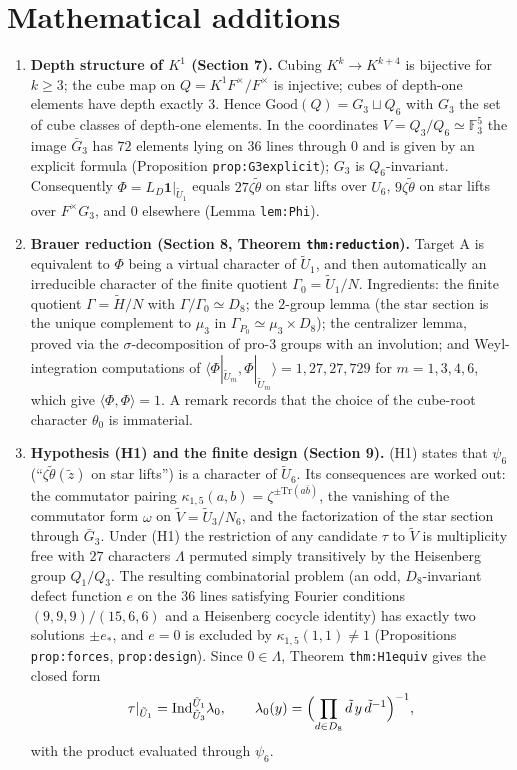 \documentclass[11pt]{article}
\newcommand{\F}{\mathbb F}
\begin{document}
\section*{Mathematical additions}
\begin{enumerate}[leftmargin=*]
\item \textbf{Depth structure of $K^1$ (Section 7).}  Cubing
$K^k\to K^{k+4}$ is bijective for $k\ge3$; the cube map on
$Q=K^1F^\times/F^\times$ is injective; cubes of depth-one elements have depth
exactly $3$.  Hence $\mathrm{Good}(Q)=G_3\sqcup Q_6$ with $G_3$ the set of
cube classes of depth-one elements.  In the coordinates
$V=Q_3/Q_6\simeq\F_3^5$ the image $\bar G_3$ has $72$ elements lying on
$36$ lines through $0$ and is given by an explicit formula (Proposition
\texttt{prop:G3explicit}); $G_3$ is $Q_6$-invariant.  Consequently
$\Phi=L_D\mathbf 1|_{\tilde U_1}$ equals $27\zeta\tilde\theta$ on star
lifts over $U_6$, $9\zeta\tilde\theta$ on star lifts over $F^\times G_3$, and
$0$ elsewhere (Lemma \texttt{lem:Phi}).

\item \textbf{Brauer reduction (Section 8, Theorem \texttt{thm:reduction}).}
Target A is equivalent to $\Phi$ being a virtual character of $\tilde U_1$,
and then automatically an irreducible character of the finite quotient
$\Gamma_0=\tilde U_1/N$.  Ingredients: the finite quotient
$\Gamma=\tilde H/N$ with $\Gamma/\Gamma_0\simeq D_8$; the $2$-group lemma
(the star section is the unique complement to $\mu_3$ in
$\Gamma_{P_0}\simeq\mu_3\times D_8$); the centralizer lemma, proved via the
$\sigma$-decomposition of pro-$3$ groups with an involution; and
Weyl-integration computations of
$\langle\Phi|_{\tilde U_m},\Phi|_{\tilde U_m}\rangle=1,27,27,729$ for
$m=1,3,4,6$, which give $\langle\Phi,\Phi\rangle=1$.  A remark records that
the choice of the cube-root character $\theta_0$ is immaterial.

\item \textbf{Hypothesis (H1) and the finite design (Section 9).}
(H1) states that $\psi_6$ (``$\zeta\tilde\theta(\tilde z)$ on star lifts'')
is a character of $\tilde U_6$.  Its consequences are worked out: the
commutator pairing $\kappa_{1,5}(a,b)=\zeta^{\pm\mathrm{Tr}(a\bar b)}$, the
vanishing of the commutator form $\omega$ on $\tilde V=\tilde U_3/N_6$, and
the factorization of the star section through $\bar G_3$.  Under (H1) the
restriction of any candidate $\tau$ to $\tilde V$ is multiplicity free with
$27$ characters $\Lambda$ permuted simply transitively by the Heisenberg
group $Q_1/Q_3$.  The resulting combinatorial problem (an odd,
$D_8$-invariant defect function $e$ on the $36$ lines satisfying Fourier
conditions $(9,9,9)/(15,6,6)$ and a Heisenberg cocycle identity) has exactly
two solutions $\pm e_*$, and $e=0$ is excluded by $\kappa_{1,5}(1,1)\neq1$
(Propositions \texttt{prop:forces}, \texttt{prop:design}).  Since
$0\in\Lambda$, Theorem \texttt{thm:H1equiv} gives the closed form
\[
 \tau|_{\tilde U_1}=\mathrm{Ind}_{\tilde U_3}^{\tilde U_1}\lambda_0,\qquad
 \lambda_0(y)=\Bigl(\prod_{d\in D_8}\tilde d\,y\,\tilde d^{-1}\Bigr)^{-1},
\]
with the product evaluated through $\psi_6$.


\end{enumerate}
\end{document}
